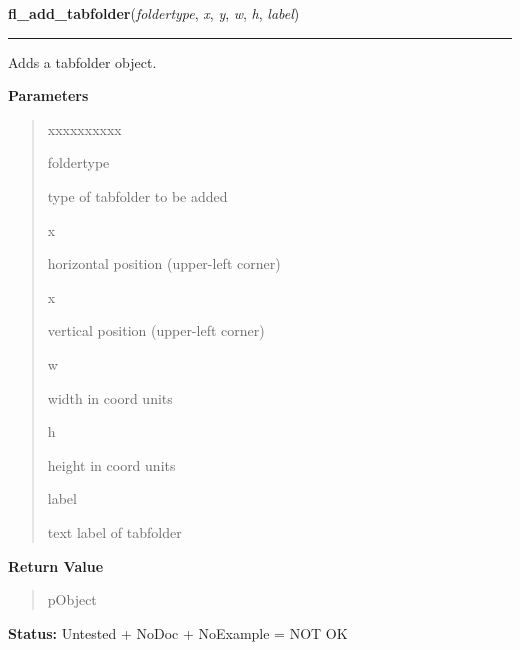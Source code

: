 \hspace{.8\funcindent}\begin{boxedminipage}{\funcwidth}

    \raggedright \textbf{fl\_add\_tabfolder}(\textit{foldertype}, \textit{x}, \textit{y}, \textit{w}, \textit{h}, \textit{label})

    \vspace{-1.5ex}

    \rule{\textwidth}{0.5\fboxrule}
\setlength{\parskip}{2ex}
    Adds a tabfolder object.

\setlength{\parskip}{1ex}
      \textbf{Parameters}
      \vspace{-1ex}

      \begin{quote}
        \begin{Ventry}{xxxxxxxxxx}

          \item[foldertype]

          type of tabfolder to be added

          \item[x]

          horizontal position (upper-left corner)

          \item[x]

          vertical position (upper-left corner)

          \item[w]

          width in coord units

          \item[h]

          height in coord units

          \item[label]

          text label of tabfolder

        \end{Ventry}

      \end{quote}

      \textbf{Return Value}
    \vspace{-1ex}

      \begin{quote}
      pObject

      \end{quote}

\textbf{Status:} Untested + NoDoc + NoExample = NOT OK



    \end{boxedminipage}

